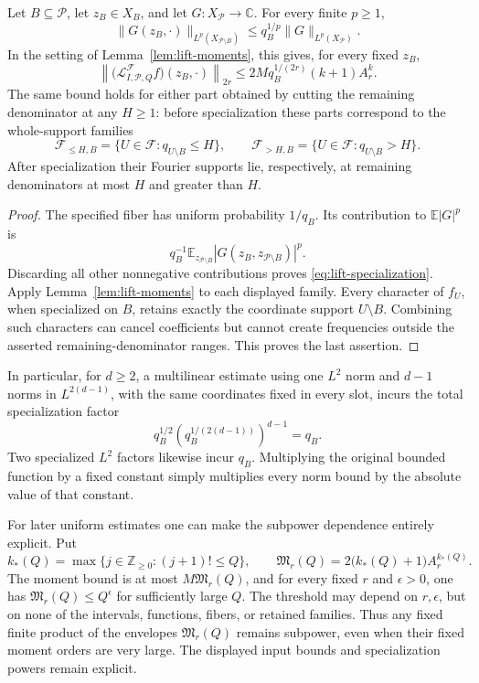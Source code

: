 \begin{lemma}
\label{lem:lift-specialization}
Let \(B\subseteq\mathcal P\), let \(z_B\in X_B\), and let
\(G:X_{\mathcal P}\to\mathbb C\).  For every finite \(p\ge1\),
\begin{equation}
 \|G(z_B,\cdot)\|_{L^p(X_{\mathcal P\setminus B})}
 \le q_B^{1/p}\|G\|_{L^p(X_{\mathcal P})}.
 \label{eq:lift-specialization}
\end{equation}
In the setting of Lemma~\ref{lem:lift-moments}, this gives, for every
fixed \(z_B\),
\[
 \left\|\bigl(\mathcal L^{\mathcal F}_{I,\mathcal P,Q}f\bigr)
                  (z_B,\cdot)\right\|_{2r}
 \le 2M q_B^{1/(2r)}(k+1)A_r^k.
\]
The same bound holds for either part obtained by cutting the remaining
denominator at any \(H\ge1\): before specialization these parts
correspond to the whole-support families
\[
 \mathcal F_{\le H,B}
  =\{U\in\mathcal F:q_{U\setminus B}\le H\},
 \qquad
 \mathcal F_{>H,B}
  =\{U\in\mathcal F:q_{U\setminus B}>H\}.
\]
After specialization their Fourier supports lie, respectively, at
remaining denominators at most \(H\) and greater than \(H\).
\end{lemma}

\begin{proof}
The specified fiber has uniform probability \(1/q_B\).  Its
contribution to \(\mathbb E|G|^p\) is
\[
 q_B^{-1}\mathbb E_{z_{\mathcal P\setminus B}}
 |G(z_B,z_{\mathcal P\setminus B})|^p.
\]
Discarding all other nonnegative contributions proves
\eqref{eq:lift-specialization}.
Apply Lemma~\ref{lem:lift-moments} to each displayed family.
Every character of \(f_U\), when specialized on \(B\), retains
exactly the coordinate support \(U\setminus B\).  Combining such
characters can cancel coefficients but cannot create frequencies
outside the asserted remaining-denominator ranges.  This proves the
last assertion.
\end{proof}

In particular, for \(d\ge2\), a multilinear estimate using one \(L^2\) norm and
\(d-1\) norms in \(L^{2(d-1)}\), with the same coordinates fixed
in every slot, incurs the total specialization factor
\[
 q_B^{1/2}\left(q_B^{1/(2(d-1))}\right)^{d-1}=q_B.
\]
Two specialized \(L^2\) factors likewise incur \(q_B\).
Multiplying the original bounded function by a fixed constant simply
multiplies every norm bound by the absolute value of that constant.

For later uniform estimates one can make the subpower dependence
entirely explicit.  Put
\[
 k_*(Q)=\max\{j\in\mathbb Z_{\ge0}:(j+1)!\le Q\},
 \qquad
 \mathfrak M_r(Q)=2\bigl(k_*(Q)+1\bigr)A_r^{k_*(Q)}.
\]
The moment bound is at most \(M\mathfrak M_r(Q)\), and for every
fixed \(r\) and \(\epsilon>0\), one has
\(\mathfrak M_r(Q)\le Q^\epsilon\) for sufficiently large \(Q\).
The threshold may depend on \(r,\epsilon\), but on none of the
intervals, functions, fibers, or retained families.  Thus any fixed
finite product of the envelopes \(\mathfrak M_r(Q)\) remains subpower,
even when their fixed moment orders are very large.  The displayed
input bounds and specialization powers remain explicit.
